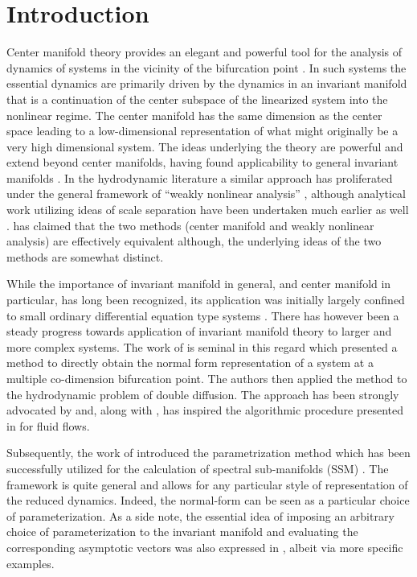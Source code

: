 \section{Introduction}
\label{sec:intro}

Center manifold theory provides an elegant and powerful tool for the analysis of dynamics of systems in the vicinity of the bifurcation point \citep{carr82,carr83b,carr83,sijbrand85,guckenheimer83,wiggins03,haragus11}. In such systems the essential dynamics are primarily driven by the dynamics in an invariant manifold that is a continuation of the center subspace of the linearized system into the nonlinear regime. The center manifold has the same dimension as the center space leading to a low-dimensional representation of what might originally be a very high dimensional system. The ideas underlying the theory are powerful and extend beyond center manifolds, having found applicability to general invariant manifolds \citep{roberts89,roberts14,haller16}. In the hydrodynamic literature a similar approach has proliferated under the general framework of ``weakly nonlinear analysis'' \citep{sipp07,cross09,meliga11,meliga12}, although analytical work utilizing ideas of scale separation have been undertaken much earlier as well \citep{stuart60,watson60,newell69}.  \citet{fujimara91} has claimed that the two methods (center manifold and weakly nonlinear analysis) are effectively equivalent although, the underlying ideas of the two methods are somewhat distinct. 

While the importance of invariant manifold in general, and center manifold in particular, has long been recognized, its application was initially largely confined to small ordinary differential equation type systems \citep{carr82,wiggins03,guckenheimer83}. There has however been a steady progress towards application of invariant manifold theory to larger and more complex systems. The work of \citet{coullet83} is seminal in this regard which presented a method to directly obtain the normal form representation of a system at a multiple co-dimension bifurcation point. The authors then applied the method to the hydrodynamic problem of double diffusion. The approach has been strongly advocated by \citet{roberts14} and, along with \cite{roberts97}, has inspired the algorithmic procedure presented in \cite{carini15} for fluid flows. 

Subsequently, the work of \citet{cabre03a,cabre03b,cabre05,haro16} introduced the parametrization method which has been successfully utilized for the calculation of spectral sub-manifolds (SSM) \citep{jain22,vizzaccaro22,opreni23,thurnher24}. The framework is quite general and allows for any particular style of representation of the reduced dynamics. Indeed, the normal-form can be seen as a particular choice of parameterization. As a side note, the essential idea of imposing an arbitrary choice of parameterization to the invariant manifold and evaluating the corresponding asymptotic vectors was also expressed in \cite{roberts97}, albeit via more specific examples.


